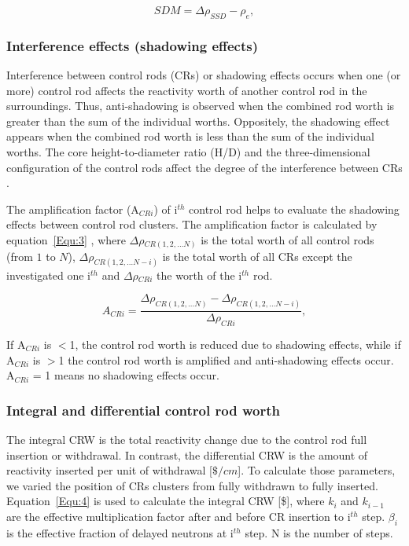 \begin{equation}
\label{Equ:6}
{SDM}={{\Delta}{\rho}_{SSD}}-{{\rho}_{e}},
\end{equation}

\subsubsection{Interference effects (shadowing effects)}

Interference between control rods (CRs) or shadowing effects occurs when one 
(or more) control rod affects the reactivity worth of another control rod in 
the surroundings. Thus, anti-shadowing is observed when the combined rod worth 
is greater than the sum of the individual worths. Oppositely, the shadowing 
effect appears when the combined rod worth is less than the sum of the 
individual worths. The core height-to-diameter ratio (H/D) and the 
three-dimensional configuration of the control rods affect the degree of the 
interference between CRs \cite{girardin2007control}. 

The amplification factor (A$_{CRi}$) of i$^{th}$ control rod helps to evaluate the shadowing effects between control rod clusters. The amplification factor is calculated by equation~\ref{Equ:3} \cite{girardin2007control,vcerba2017optimization}, where $\Delta\rho$$_{CR(1,2,\ldots N)}$ is the total worth of all control rods (from $1$ to $N$), $\Delta\rho$$_{CR(1,2,\ldots N-i)}$ is the total worth of all CRs except the investigated one i$^{th}$ and $\Delta\rho$$_{CRi}$ the worth of the i$^{th}$ rod.

\begin{equation}
\label{Equ:3}
{{A}_{CRi}}=\dfrac{{{\Delta}{\rho}_{CR(1,2,\ldots N)}}-{{\Delta}{\rho}_{CR(1,2,\ldots N-i)}}}{{\Delta}{\rho}_{CRi}},
\end{equation}

If A$_{CRi}$ is $<$1, the control rod worth is reduced due to shadowing effects, while if A$_{CRi}$ is $>$1 the control rod worth is amplified and anti-shadowing effects occur. A$_{CRi}$ = 1 means no shadowing effects occur.

\subsubsection{Integral and differential control rod worth}

The integral CRW is the total reactivity change due to the control rod full 
insertion or withdrawal. In contrast, the differential CRW is the amount of 
reactivity inserted per unit of withdrawal [$\$/cm$]. To calculate those 
parameters, we varied the position of CRs clusters from fully withdrawn to 
fully inserted. Equation~\ref{Equ:4} is used to calculate the integral CRW 
[\$], where $k_{i}$ and $k_{i-1}$ are the effective multiplication factor 
after and before CR insertion to i$^{th}$ step. $\beta_{i}$ is the effective 
fraction of delayed neutrons at i$^{th}$ step. N is the number of steps.

